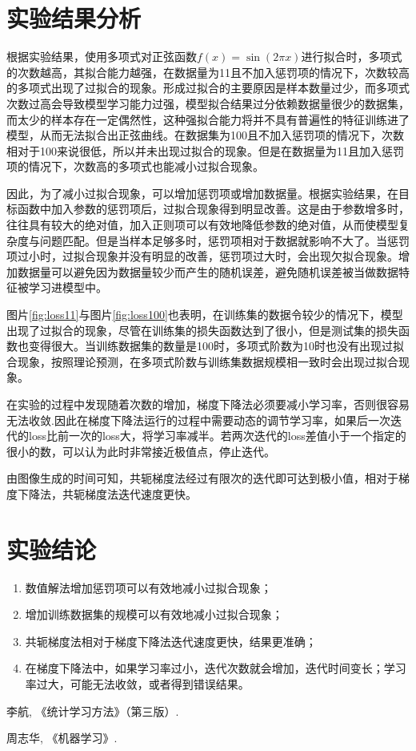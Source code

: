 \documentclass{hitreport}
\begin{document}
\section{实验结果分析}

根据实验结果，使用多项式对正弦函数$f\left(x\right) = \sin \left(2\pi x\right)$进行拟合时，多项式的次数越高，其拟合能力越强，在数据量为11且不加入惩罚项的情况下，次数较高的多项式出现了过拟合的现象。形成过拟合的主要原因是样本数量过少，而多项式次数过高会导致模型学习能力过强，模型拟合结果过分依赖数据量很少的数据集，而太少的样本存在一定偶然性，这种强拟合能力将并不具有普遍性的特征训练进了模型，从而无法拟合出正弦曲线。在数据集为100且不加入惩罚项的情况下，次数相对于100来说很低，所以并未出现过拟合的现象。但是在数据量为11且加入惩罚项的情况下，次数高的多项式也能减小过拟合现象。

因此，为了减小过拟合现象，可以增加惩罚项或增加数据量。根据实验结果，在目标函数中加入参数的惩罚项后，过拟合现象得到明显改善。这是由于参数增多时，往往具有较大的绝对值，加入正则项可以有效地降低参数的绝对值，从而使模型复杂度与问题匹配。但是当样本足够多时，惩罚项相对于数据就影响不大了。当惩罚项过小时，过拟合现象并没有明显的改善，惩罚项过大时，会出现欠拟合现象。增加数据量可以避免因为数据量较少而产生的随机误差，避免随机误差被当做数据特征被学习进模型中。

图片\ref{fig:loss11}与图片\ref{fig:loss100}也表明，在训练集的数据令较少的情况下，模型出现了过拟合的现象，尽管在训练集的损失函数达到了很小，但是测试集的损失函数也变得很大。当训练数据集的数量是100时，多项式阶数为10时也没有出现过拟合现象，按照理论预测，在多项式阶数与训练集数据规模相一致时会出现过拟合现象。

在实验的过程中发现随着次数的增加，梯度下降法必须要减小学习率，否则很容易无法收敛.因此在梯度下降法运行的过程中需要动态的调节学习率，如果后一次迭代的loss比前一次的loss大，将学习率减半。若两次迭代的loss差值小于一个指定的很小的数，可以认为此时非常接近极值点，停止迭代。

由图像生成的时间可知，共轭梯度法经过有限次的迭代即可达到极小值，相对于梯度下降法，共轭梯度法迭代速度更快。



\section{实验结论}

\begin{enumerate}
\item 数值解法增加惩罚项可以有效地减小过拟合现象；
\item 增加训练数据集的规模可以有效地减小过拟合现象；
\item 共轭梯度法相对于梯度下降法迭代速度更快，结果更准确；
\item 在梯度下降法中，如果学习率过小，迭代次数就会增加，迭代时间变长；学习率过大，可能无法收敛，或者得到错误结果。
\end{enumerate}

\renewcommand\refname{参考文献}
 
\begin{thebibliography}{2}
李航, 《统计学习方法》（第三版）.

周志华, 《机器学习》.
\end{thebibliography}
\end{document}
